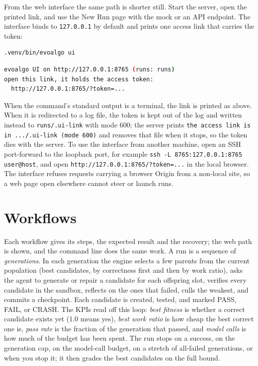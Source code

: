 From the web interface the same path is shorter still. Start the server, open
the printed link, and use the New Run page with the mock or an API endpoint.
The interface binds to \texttt{127.0.0.1} by default and prints one access
link that carries the token:

\begin{lstlisting}[language=bash, basicstyle=\ttfamily\small]
.venv/bin/evoalgo ui
\end{lstlisting}

\begin{lstlisting}[language=bash, basicstyle=\ttfamily\small]
evoalgo UI on http://127.0.0.1:8765 (runs: runs)
open this link, it holds the access token:
  http://127.0.0.1:8765/?token=...
\end{lstlisting}

When the command's standard output is a terminal, the link is printed as above.
When it is redirected to a log file, the token is kept out of the log and
written instead to \texttt{runs/.ui-link} with mode 600; the server prints
\texttt{the access link is in .../.ui-link (mode 600)} and removes that file
when it stops, so the token dies with the server. To use the interface from
another machine, open an SSH port-forward to the loopback port, for example
\texttt{ssh -L 8765:127.0.0.1:8765 user@host}, and open
\texttt{http://127.0.0.1:8765/?token=...} in the local browser. The interface
refuses requests carrying a browser Origin from a non-local site, so a web page
open elsewhere cannot steer or launch runs.

\section{Workflows}
\label{sec:ud-workflows}

Each workflow gives its steps, the expected result and the recovery; the web
path is shown, and the command line does the same work. A run is a sequence of \emph{generations}. In each generation the engine selects
a few parents from the current population (best candidates, by correctness first
and then by work ratio), asks the agent to generate or repair a candidate for
each offspring slot, verifies every candidate in the sandbox, reflects on the
ones that failed, culls the weakest, and commits a checkpoint. Each candidate is
created, tested, and marked PASS, FAIL, or CRASH. The KPIs read off this loop:
\emph{best fitness} is whether a correct candidate exists yet (1.0 means yes),
\emph{best work ratio} is how cheap the best correct one is, \emph{pass rate} is
the fraction of the generation that passed, and \emph{model calls} is how much
of the budget has been spent. The run stops on a success, on the generation cap,
on the model-call budget, on a stretch of all-failed generations, or when you
stop it; it then grades the best candidates on the full bound.

